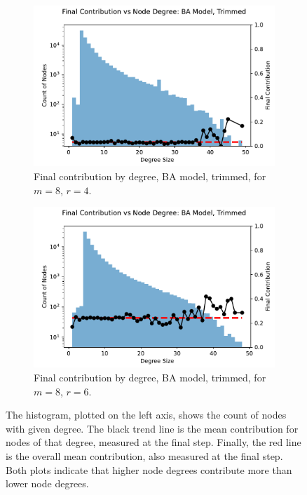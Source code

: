 \FloatBarrier 
\begin{figure}[!h]
  \begin{subfigure}[b]{0.45\textwidth}
    \includegraphics[width=1.1\textwidth]{images/ID_BA_node_groups_m_8_phi_4_trimmed.pdf}
    \caption{Final contribution by degree, BA model, trimmed, for $m=8$, $r=4$.   }
    \label{ID_by_degree_m_8_phi_4}
  \end{subfigure}
  \hfill
  \begin{subfigure}[b]{0.45\textwidth}
    \includegraphics[width=1.1\textwidth]{images/ID_BA_node_groups_m_8_phi_6_trimmed.pdf}
    \caption{Final contribution by degree, BA model, trimmed, for $m=8$, $r=6$. }
    \label{ID_by_degree_m_8_phi_6}
  \end{subfigure}
  \caption{The histogram, plotted on the left axis, shows the count of nodes with given degree. The black trend line is the mean contribution for nodes of that degree, measured at the final step. Finally, the red line is the overall mean contribution, also measured at the final step. Both plots indicate that higher node degrees contribute more than lower node degrees.} \label{ID_by_degree_m_8}
\end{figure} 
\FloatBarrier

